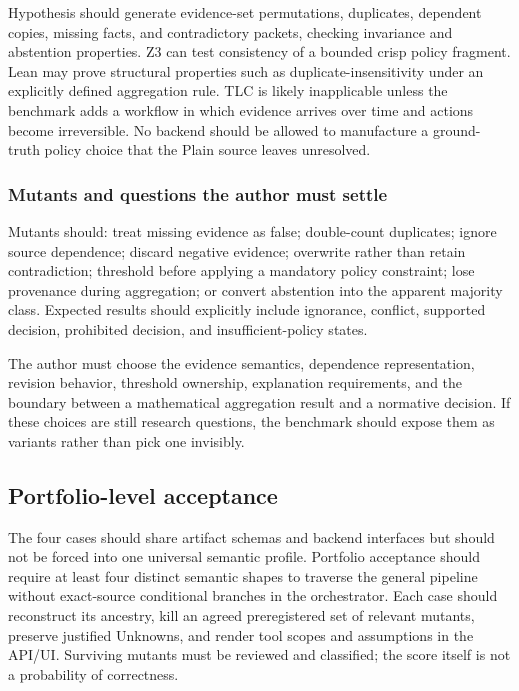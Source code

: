 \documentclass[11pt]{article}
\begin{document}
Hypothesis should generate evidence-set permutations, duplicates, dependent
copies, missing facts, and contradictory packets, checking invariance and
abstention properties.  Z3 can test consistency of a bounded crisp policy
fragment.  Lean may prove structural properties such as duplicate-insensitivity
under an explicitly defined aggregation rule.  TLC is likely inapplicable
unless the benchmark adds a workflow in which evidence arrives over time and
actions become irreversible.  No backend should be allowed to manufacture a
ground-truth policy choice that the Plain source leaves unresolved.

\subsubsection*{Mutants and questions the author must settle}

Mutants should: treat missing evidence as false; double-count duplicates;
ignore source dependence; discard negative evidence; overwrite rather than
retain contradiction; threshold before applying a mandatory policy constraint;
lose provenance during aggregation; or convert abstention into the apparent
majority class.  Expected results should explicitly include ignorance,
conflict, supported decision, prohibited decision, and insufficient-policy
states.

The author must choose the evidence semantics, dependence representation,
revision behavior, threshold ownership, explanation requirements, and the
boundary between a mathematical aggregation result and a normative decision.
If these choices are still research questions, the benchmark should expose
them as variants rather than pick one invisibly.

\subsection{Portfolio-level acceptance}

The four cases should share artifact schemas and backend interfaces but should
not be forced into one universal semantic profile.  Portfolio acceptance
should require at least four distinct semantic shapes to traverse the general
pipeline without exact-source conditional branches in the orchestrator.  Each
case should reconstruct its ancestry, kill an agreed preregistered set of
relevant mutants, preserve justified Unknowns, and render tool scopes and
assumptions in the API/UI.  Surviving mutants must be reviewed and classified;
the score itself is not a probability of correctness.
\end{document}
